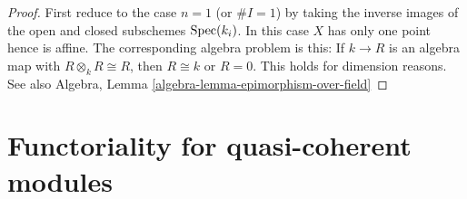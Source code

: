 \begin{proof}
First reduce to the case $n = 1$ (or $\# I = 1$)
by taking the inverse images of the
open and closed subschemes $\mathop{\mathrm{Spec}}(k_i)$.
In this case $X$ has only one point hence is affine.
The corresponding algebra problem is this:
If $k \to R$ is an algebra map
with $R \otimes_k R \cong R$, then $R \cong k$ or $R = 0$.
This holds for dimension reasons.
See also
Algebra, Lemma \ref{algebra-lemma-epimorphism-over-field}
\end{proof}










\section{Functoriality for quasi-coherent modules}
\label{section-quasi-coherent}

